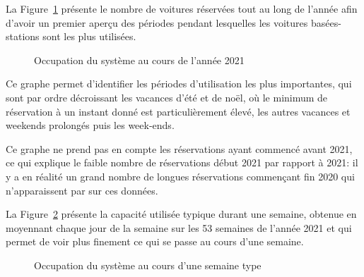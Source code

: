 \documentclass[12pt,a4paper]{article}
\newcommand{\1}[1]{\mathbbm{1}_{\{#1\}} }
\theoremstyle{definition}
\begin{document}
{La Figure~\ref{Année_sbcs} présente le nombre de voitures réservées tout au long de l'année afin d'avoir un premier aperçu des périodes pendant lesquelles les voitures basées-stations sont les plus utilisées. 

\begin{figure}[!h]
\centering
{}
\caption{Occupation du système au cours de l'année 2021}
\label{Année_sbcs}
\end{figure}

Ce graphe permet d'identifier les périodes d'utilisation les plus importantes, qui sont par ordre décroissant les vacances d'été et de noël, où le minimum de réservation à un instant donné est particulièrement élevé, les autres vacances et weekends prolongés puis les week-ends.

Ce graphe ne prend pas en compte les réservations ayant commencé avant 2021, ce qui explique le faible nombre de réservations début 2021 par rapport à 2021: il y a en réalité un grand nombre de longues réservations commençant fin 2020 qui n'apparaissent par sur ces données.


La Figure~\ref{semaine_type} présente la capacité utilisée typique durant une semaine, obtenue en moyennant chaque jour de la semaine sur les 53 semaines de l'année 2021 et qui permet de voir plus finement ce qui se passe au cours d'une semaine.

\begin{figure}[!h]
\centering
{}
\caption{Occupation du système au cours d'une semaine type}
\label{semaine_type}
\end{figure}

}
\end{document}
